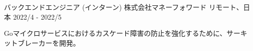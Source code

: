 \begin{cventries}
  \cventry
    {バックエンドエンジニア (インターン)} %
    {株式会社マネーフォワード} %
    {リモート、日本} %
    {2022/4 - 2022/5} %
    {
      \begin{cvjobdesc} %
        Goマイクロサービスにおけるカスケード障害の防止を強化するために、サーキットブレーカーを開発。
      \end{cvjobdesc}
    }



\end{cventries}
